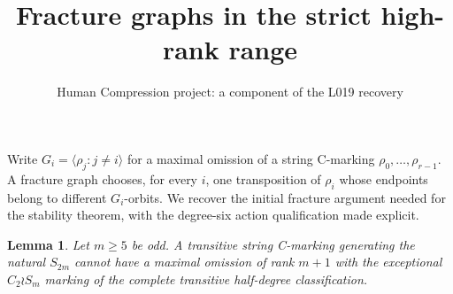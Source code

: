 \documentclass[11pt,a4paper]{article}
\title{Fracture graphs in the strict high-rank range}
\author{Human Compression project: a component of the L019 recovery}
\date{}
\newtheorem{lemma}{Lemma}
\newcommand{\gen}[1]{\langle#1\rangle}
\begin{document}
\maketitle
Write $G_i=\gen{\rho_j:j\ne i}$ for a maximal omission of a
string C-marking $\rho_0,\ldots,\rho_{r-1}$. A fracture graph
chooses, for every $i$, one transposition of $\rho_i$ whose endpoints
belong to different $G_i$-orbits. We recover the initial fracture
argument needed for the stability theorem, with the degree-six
action qualification made explicit.

\begin{lemma}\label{wreath}
Let $m\ge5$ be odd. A transitive string C-marking generating
the natural $S_{2m}$ cannot have a maximal omission of rank
$m+1$ with the exceptional $C_2\wr S_m$ marking of the complete
transitive half-degree classification.
\end{lemma}
\end{document}
